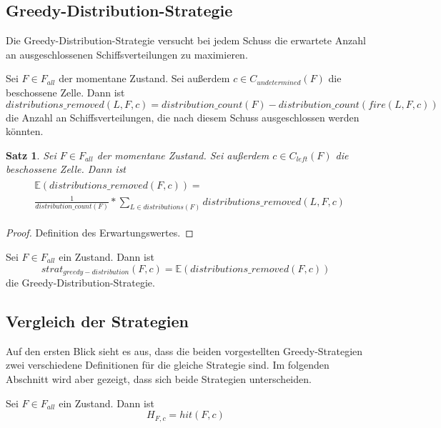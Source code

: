 \documentclass[a4paper,12pt]{llncs}
\numberwithin{equation}{section}
\newtheorem{satz}{Satz}
\begin{document}
\subsection{Greedy-Distribution-Strategie}
Die Greedy-Distribution-Strategie versucht bei jedem Schuss die erwartete Anzahl an ausgeschlossenen Schiffsverteilungen zu maximieren.

\begin{definition}
Sei $F\in F_{all}$ der momentane Zustand.
Sei außerdem $c \in C_{undetermined}(F)$ die beschossene Zelle.
Dann ist
\[
distributions\_removed(L, F, c)=distribution\_count(F) - distribution\_count(fire(L, F,c))
\]
die Anzahl an Schiffsverteilungen, die nach diesem Schuss ausgeschlossen werden könnten.
\end{definition}

\begin{satz}
Sei $F\in F_{all}$ der momentane Zustand.
Sei außerdem $c \in C_{left}(F)$ die beschossene Zelle.
Dann ist
\begin{align}
\begin{split}
&\mathds{E}(distributions\_removed(F,c))=\\
&\frac{1}{distribution\_count(F)} * \sum_{L \in distributions(F)} distributions\_removed(L, F, c) \nonumber
\end{split}
\end{align}
\end{satz}

\begin{proof}
Definition des Erwartungswertes.
\end{proof}

\begin{definition}
Sei $F\in F_{all}$ ein Zustand.
Dann ist
\[
strat_{greedy-distribution}(F,c)=\mathds{E}(distributions\_removed(F,c))
\]
die Greedy-Distribution-Strategie.
\end{definition}

\subsection{Vergleich der Strategien}
Auf den ersten Blick sieht es aus, dass die beiden vorgestellten Greedy-Strategien zwei verschiedene Definitionen für die gleiche Strategie sind. Im folgenden Abschnitt wird aber gezeigt, dass sich beide Strategien unterscheiden.

\begin{definition}
Sei $F\in F_{all}$ ein Zustand.
Dann ist
\[
H_{F,c}=hit(F,c)
\]
\end{definition}
\end{document}
